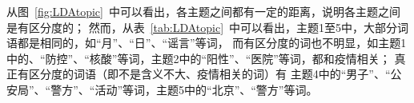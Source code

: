 \documentclass[UTF8]{ctexart}
\begin{document}

从图~\ref{fig:LDAtopic}~中可以看出，各主题之间都有一定的距离，说明各主题之间是有区分度的；
然而，从表~\ref{tab:LDAtopic}~中可以看出，主题1至5中，大部分词语都是相同的，如“月”、“日”、“谣言”等词，
而有区分度的词也不明显，如主题1中的、“防控”、“核酸”等词，主题2中的“阳性”、“医院”等词，都和疫情相关；
真正有区分度的词语（即不是含义不大、疫情相关的词）有
主题4中的“男子”、“公安局”、“警方”、“活动”等词，主题5中的“北京”、“警方”等词。
\end{document}
